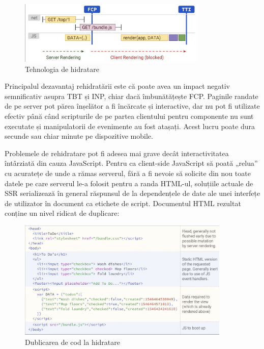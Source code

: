 \documentclass[12pt, a4paper]{report}
\begin{document}
\begin{figure}[htbp]
	\centering
	\includegraphics[width=0.8\textwidth]{hydratation.png}
	\caption{Tehnologia de hidratare}
	\label{fig:hydratation}
\end{figure}

Principalul dezavantaj rehidratării este că poate avea un impact negativ semnificativ asupra TBT și INP, chiar dacă îmbunătățește FCP. Paginile randate de pe server pot părea înșelător a fi încărcate și interactive, dar nu pot fi utilizate efectiv până când scripturile de pe partea clientului pentru componente nu sunt executate și manipulatorii de evenimente au fost atașați. Acest lucru poate dura secunde sau chiar minute pe dispozitive mobile.

Problemele de rehidratare pot fi adesea mai grave decât interactivitatea întârziată din cauza JavaScript. Pentru ca client-side JavaScript să poată „relua” cu acuratețe de unde a rămas serverul, fără a fi nevoie să solicite din nou toate datele pe care serverul le-a folosit pentru a randa HTML-ul, soluțiile actuale de SSR serializează în general răspunsul de la dependențele de date ale unei interfețe de utilizator în document ca etichete de script. Documentul HTML rezultat conține un nivel ridicat de duplicare:

\begin{figure}[htbp]
	\centering
	\includegraphics[width=0.9\textwidth]{hydratation-duplication.png}
	\caption{Dublicarea de cod la hidratare}
	\label{fig:hydratation-dublication}
\end{figure}
\end{document}
